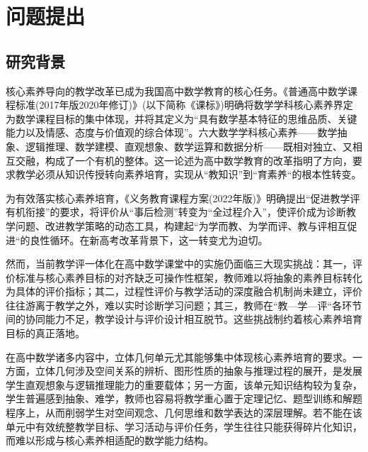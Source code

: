 \documentclass[UTF8,a4paper,12pt,twoside]{ctexart}
\begin{document}

\newpage%
\pagestyle{empty}
\setcounter{tocdepth}{2}%
\tableofcontents%
\newpage%

\newpage
\section{问题提出}
\subsection{研究背景}
核心素养导向的教学改革已成为我国高中数学教育的核心任务。《普通高中数学课程标准(2017年版2020年修订)》(以下简称《课标》)明确将数学学科核心素养界定为数学课程目标的集中体现，并将其定义为“具有数学基本特征的思维品质、关键能力以及情感、态度与价值观的综合体现”。六大数学学科核心素养——数学抽象、逻辑推理、数学建模、直观想象、数学运算和数据分析——既相对独立、又相互交融，构成了一个有机的整体。这一论述为高中数学教育的改革指明了方向，要求教学必须从知识传授转向素养培育，实现从“教知识”到“育素养“的根本性转变。

为有效落实核心素养培育，《义务教育课程方案(2022年版)》明确提出“促进教学评有机衔接”的要求，将评价从“事后检测”转变为“全过程介入”，使评价成为诊断教学问题、改进教学策略的动态工具，构建起“为学而教、为学而评、教与评相互促进“的良性循环。在新高考改革背景下，这一转变尤为迫切。

然而，当前教学评一体化在高中数学课堂中的实施仍面临三大现实挑战：其一，评价标准与核心素养目标的对齐缺乏可操作性框架，教师难以将抽象的素养目标转化为具体的评价指标；其二，过程性评价与教学活动的深度融合机制尚未建立，评价往往游离于教学之外，难以实时诊断学习问题；其三，教师在“教—学—评“各环节间的协同能力不足，教学设计与评价设计相互脱节。这些挑战制约着核心素养培育目标的真正落地。

在高中数学诸多内容中，立体几何单元尤其能够集中体现核心素养培育的要求。一方面，立体几何涉及空间关系的辨析、图形性质的抽象与推理过程的展开，是发展学生直观想象与逻辑推理能力的重要载体；另一方面，该单元知识结构较为复杂，学生普遍感到抽象、难学，教师也容易将教学重心置于定理记忆、题型训练和解题程序上，从而削弱学生对空间观念、几何思维和数学表达的深层理解。若不能在该单元中有效统整教学目标、学习活动与评价任务，学生往往只能获得碎片化知识，而难以形成与核心素养相适配的数学能力结构。
\end{document}
